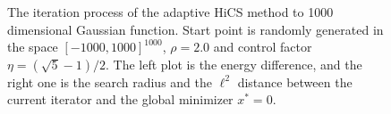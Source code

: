 \begin{figure}[!htbp]
\begin{minipage}[b]{0.5\linewidth}
{	  }
	\end{minipage}
	  \caption{The iteration process of the adaptive HiCS method to 1000
	  dimensional Gaussian function. 
	  Start point is randomly generated in the space $[-1000,
	  1000]^{1000}$, $\rho=2.0$ and control factor
	  $\eta=(\sqrt{5}-1)/2$. The left plot is the energy
	  difference, and the right one is the search radius and 
	  the $\ell^2$ distance between the current iterator and the
	  global minimizer $x^*=0$.
	  } 
	  \label{fig:gauss:1000D}
\end{figure}

